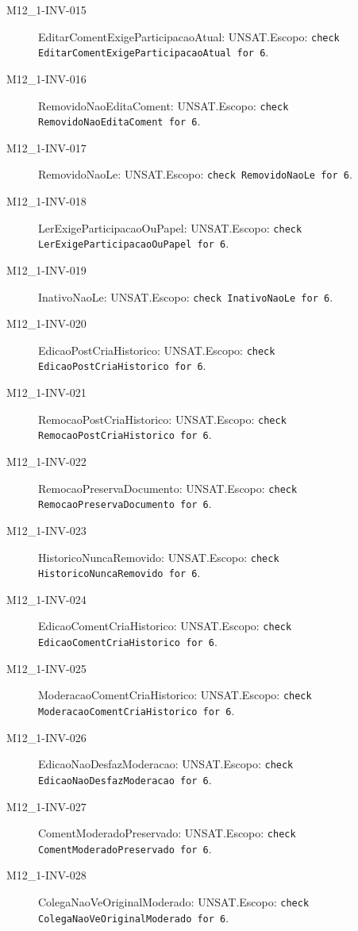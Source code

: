 \begin{description}
\item[M12\_1-INV-015] EditarComentExigeParticipacaoAtual: UNSAT.\newline Escopo: \texttt{check EditarComentExigeParticipacaoAtual for 6}.
\item[M12\_1-INV-016] RemovidoNaoEditaComent: UNSAT.\newline Escopo: \texttt{check RemovidoNaoEditaComent for 6}.
\item[M12\_1-INV-017] RemovidoNaoLe: UNSAT.\newline Escopo: \texttt{check RemovidoNaoLe for 6}.
\item[M12\_1-INV-018] LerExigeParticipacaoOuPapel: UNSAT.\newline Escopo: \texttt{check LerExigeParticipacaoOuPapel for 6}.
\item[M12\_1-INV-019] InativoNaoLe: UNSAT.\newline Escopo: \texttt{check InativoNaoLe for 6}.
\item[M12\_1-INV-020] EdicaoPostCriaHistorico: UNSAT.\newline Escopo: \texttt{check EdicaoPostCriaHistorico for 6}.
\item[M12\_1-INV-021] RemocaoPostCriaHistorico: UNSAT.\newline Escopo: \texttt{check RemocaoPostCriaHistorico for 6}.
\item[M12\_1-INV-022] RemocaoPreservaDocumento: UNSAT.\newline Escopo: \texttt{check RemocaoPreservaDocumento for 6}.
\item[M12\_1-INV-023] HistoricoNuncaRemovido: UNSAT.\newline Escopo: \texttt{check HistoricoNuncaRemovido for 6}.
\item[M12\_1-INV-024] EdicaoComentCriaHistorico: UNSAT.\newline Escopo: \texttt{check EdicaoComentCriaHistorico for 6}.
\item[M12\_1-INV-025] ModeracaoComentCriaHistorico: UNSAT.\newline Escopo: \texttt{check ModeracaoComentCriaHistorico for 6}.
\item[M12\_1-INV-026] EdicaoNaoDesfazModeracao: UNSAT.\newline Escopo: \texttt{check EdicaoNaoDesfazModeracao for 6}.
\item[M12\_1-INV-027] ComentModeradoPreservado: UNSAT.\newline Escopo: \texttt{check ComentModeradoPreservado for 6}.
\item[M12\_1-INV-028] ColegaNaoVeOriginalModerado: UNSAT.\newline Escopo: \texttt{check ColegaNaoVeOriginalModerado for 6}.

\end{description}
